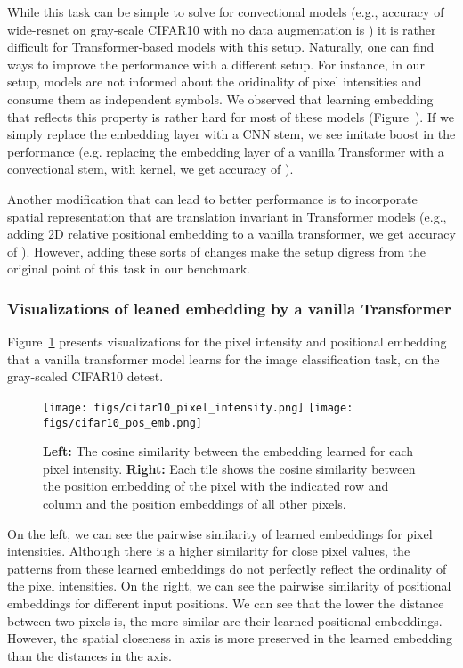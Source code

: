 \documentclass{article} \usepackage{iclr2021_conference,times}
\begin{document}
While this task can be simple to solve for convectional models (e.g., accuracy of wide-resnet on gray-scale CIFAR10 with no data augmentation is ) it is rather difficult for Transformer-based models with this setup. 
Naturally, one can find ways to improve the performance with a different setup. For instance, in our setup, models are not informed about the oridinality of pixel intensities and consume them as independent symbols. We observed that learning embedding that reflects this property is rather hard for most of these models (Figure~).  If we simply replace the embedding layer with a CNN stem, we see imitate boost in the performance (e.g. replacing the embedding layer of a vanilla Transformer with a convectional stem, with  kernel, we  get accuracy of ). 

Another modification that can lead to better performance is to incorporate spatial representation that are translation invariant in Transformer models (e.g., adding 2D relative positional embedding to a vanilla transformer, we get accuracy of ). However, adding these sorts of changes make the setup digress from the original point of this task in our benchmark.

\subsubsection{Visualizations of leaned embedding by a vanilla Transformer}
Figure~\ref{fig:cifar10_visualization} presents visualizations for the pixel intensity and positional embedding that a vanilla transformer model learns for the image classification task, on the gray-scaled CIFAR10 detest. 
\begin{figure}[h!]
    \centering
    \texttt{[image: figs/cifar10\_pixel\_intensity.png]}
    \hspace{4pt}
    \texttt{[image: figs/cifar10\_pos\_emb.png]}
    \caption{
        \textbf{Left:} The cosine similarity between the embedding learned for each pixel intensity. 
        \textbf{Right:} Each tile shows the cosine similarity between the position embedding of the pixel with the indicated row and column and the position embeddings of all other pixels.}
    \label{fig:cifar10_visualization}
\end{figure}

On the left, we can see the pairwise similarity of learned embeddings for pixel intensities.  Although there is a higher similarity for close pixel values, the patterns from these learned embeddings do not perfectly reflect the ordinality of the pixel intensities. 
On the right, we can see the pairwise similarity of positional embeddings for different input positions. We can see that the lower the distance between two pixels is, the more similar are their learned positional embeddings. However, the spatial closeness in  axis is more preserved in the learned embedding than the distances in the  axis.
\end{document}
